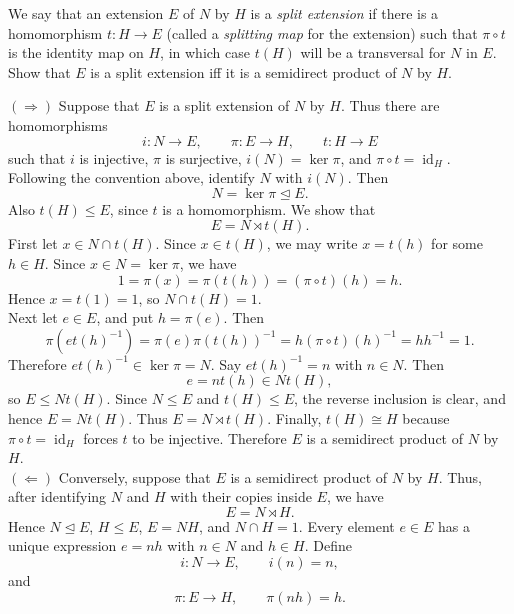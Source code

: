 \documentclass[../Odyssey_Project.tex]{subfiles}
\begin{document}
\begin{exercise}
\label{ex:2.11}
We say that an extension $E$ of $N$ by $H$ is a \emph{split extension} if there is a homomorphism $t : H \to E$ (called a \emph{splitting map} for the extension) such that $\pi \circ t$ is the identity map on $H$, in which case $t(H)$ will be a transversal for $N$ in $E$. Show that $E$ is a split extension iff it is a semidirect product of $N$ by $H$.
\end{exercise}
\begin{solution}
    $(\Rightarrow)$ Suppose that $E$ is a split extension of $N$ by $H$. Thus there are homomorphisms
    \[
        i \colon N \to E,
        \qquad
        \pi \colon E \to H,
        \qquad
        t \colon H \to E
    \]
    such that $i$ is injective, $\pi$ is surjective, $i(N) = \ker\pi$, and $\pi \circ t = \operatorname{id}_H$. Following the convention above, identify $N$ with $i(N)$. Then
    \[
        N = \ker\pi \trianglelefteq E.
    \]
    Also $t(H) \leq E$, since $t$ is a homomorphism. We show that
    \[
        E = N \rtimes t(H).
    \]
    First let $x \in N \cap t(H)$. Since $x \in t(H)$, we may write $x = t(h)$ for some $h \in H$. Since $x \in N = \ker\pi$, we have
    \[
        1 = \pi(x) = \pi(t(h)) = (\pi \circ t)(h) = h.
    \]
    Hence $x = t(1) = 1$, so $N \cap t(H) = 1$. \\
    Next let $e \in E$, and put $h = \pi(e)$. Then
    \[
        \pi(et(h)^{-1})
        =
        \pi(e)\pi(t(h))^{-1}
        =
        h(\pi \circ t)(h)^{-1}
        =
        hh^{-1}
        =
        1.
    \]
    Therefore $et(h)^{-1} \in \ker\pi = N$. Say $et(h)^{-1} = n$ with $n \in N$. Then
    \[
        e = nt(h) \in Nt(H),
    \]
    so $E \leq Nt(H)$. Since $N \leq E$ and $t(H) \leq E$, the reverse inclusion is clear, and hence $E = Nt(H)$. Thus $E = N \rtimes t(H)$. Finally, $t(H) \cong H$ because $\pi \circ t = \operatorname{id}_H$ forces $t$ to be injective. Therefore $E$ is a semidirect product of $N$ by $H$. \\
    $(\Leftarrow)$ Conversely, suppose that $E$ is a semidirect product of $N$ by $H$. Thus, after identifying $N$ and $H$ with their copies inside $E$, we have
    \[
        E = N \rtimes H.
    \]
    Hence $N \trianglelefteq E$, $H \leq E$, $E = NH$, and $N \cap H = 1$. Every element $e \in E$ has a unique expression $e = nh$ with $n \in N$ and $h \in H$. Define
    \[
        i \colon N \to E,
        \qquad
        i(n) = n,
    \]
    and
    \[
        \pi \colon E \to H,
        \qquad
        \pi(nh) = h.
    \]

\end{solution}
\end{document}
